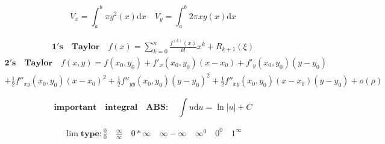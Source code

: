 \documentclass{article}
\begin{document}
\begin{displaymath} 
    V_{x} = \int_{a}^{b} \pi y^2(x)\mathrm{d}x \quad V_{y}= \int_{a}^{b}2\pi xy(x)\mathrm{d}x  
\end{displaymath}

\begin{align*} 
    \mathbf{1's \quad Taylor} \quad f(x) = \sum_{k=0}^{n}\frac{f^{(k)}(x)}{k!}x^{k} + R_{k+1}(\xi)
\end{align*}
\begin{align*} 
    \mathbf{2's \quad Taylor} \quad f(x,y) = f(x_{0},y_{0})+ f'_{x}(x_{0},y_{0})(x-x_{0}) + f'_{y}(x_{0},y_{0})(y-y_{0}) 
    \\ + \frac{1}{2}f''_{xy}(x_{0},y_{0})(x-x_{0})^2 + \frac{1}{2}f''_{yy}(x_{0},y_{0})(y-y_{0})^2 + \frac{1}{2}f''_{xy}(x_{0},y_{0})(x-x_{0})(y-y_{0}) + o(\rho) 
\end{align*}

\begin{displaymath} 
    \mathbf{important \quad integral \quad ABS }: \quad \int u \mathrm{d}u = \ln|u| + C 
\end{displaymath}

\begin{align*}
    \lim \mathbf{type} : \frac{0}{0} \quad \frac{\infty}{\infty} \quad 0 * \infty \quad \infty - \infty \quad \infty^{0} \quad 0^0 \quad 1^{\infty}
\end{align*}

\clearpage
\end{document}
